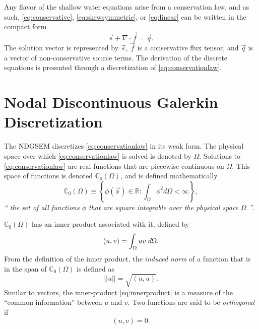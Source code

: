 \documentclass{softwaremanual}
\begin{document}
Any flavor of the shallow water equations arise from a conservation law, and as such, \eqref{eq:conservative}, \eqref{eq:skewsymmetric}, or \eqref{eq:linear} can be written in the compact form
\begin{equation}
\vec{s} + \nabla \cdot \vec{f} = \vec{q}. \label{eq:conservationlaw}
\end{equation}
The solution vector is represented by $\vec{s}$, $\vec{f}$ is a conservative flux tensor, and $\vec{q}$ is a vector of non-conservative source terms. The derivation of the discrete equations is presented through a discretization of \eqref{eq:conservationlaw}. 

\section{Nodal Discontinuous Galerkin Discretization}
The NDGSEM discretizes \eqref{eq:conservationlaw} in its weak form. The physical space over which \eqref{eq:conservationlaw} is solved is denoted by $\Omega$. Solutions to \eqref{eq:conservationlaw} are real functions that are piecewise continuous on $\Omega$. This space of functions is denoted $\mathbb{C}_0(\Omega)$, and is defined mathematically
\begin{equation}
\mathbb{C}_0(\Omega) \equiv \left\lbrace \phi(\vec{x}) \in \mathbb{R} : \int_{\Omega} \phi^2 d\Omega < \infty \right\rbrace,
\end{equation}
\textit{`` the set of all functions $\phi$ that are square integrable over the physical space $\Omega$ ''}.

$\mathbb{C}_0(\Omega)$ has an inner product associated with it, defined by
\begin{equation}
(u,v) = \int_{\Omega} uv \hspace{1mm} d\Omega. \label{eq:innerproduct}
\end{equation}
From the definition of the inner product, the \textit{induced norm} of a function that is in the span of $\mathbb{C}_0(\Omega)$ is defined as
\begin{equation}
||u|| = \sqrt{(u,u)}.\label{eq:norm}
\end{equation}
Similar to vectors, the inner-product \eqref{eq:innerproduct} is a measure of the ``common information'' between $u$ and $v$. Two functions are said to be \textit{orthogonal} if
\begin{equation}
(u,v) = 0. \label{eq:orthogonality}
\end{equation}
\end{document}
